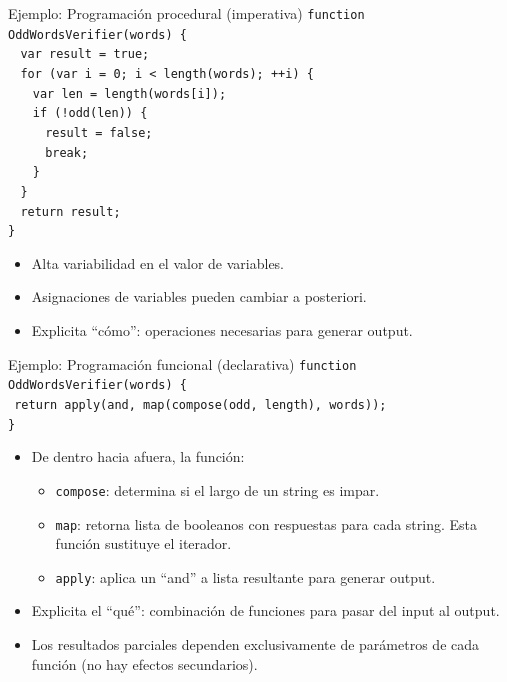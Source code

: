 \documentclass{beamer} %
\begin{document}
\begin{frame}{Ejemplo: Programación procedural (imperativa)}
  \texttt{function OddWordsVerifier(words) \{}\\
  $~~~~$\texttt{var result = true;}\\
  $~~~~$\texttt{for (var i = 0; i < length(words); ++i) \{}\\
  $~~~~~~~~$\texttt{var len = length(words[i]);}\\
  $~~~~~~~~$\texttt{if (!odd(len)) \{}\\
  $~~~~~~~~~~~~$\texttt{result = false;}\\
  $~~~~~~~~~~~~$\texttt{break;}\\
  $~~~~~~~~$\texttt{\}}\\
  $~~~~$\texttt{\}}\\
  $~~~~$\texttt{return result;}\\
  \texttt{\}}
  \pause
  \begin{itemize}
    \item Alta variabilidad en el valor de variables.
    \item Asignaciones de variables pueden cambiar a posteriori.
    \item Explicita ``cómo'': operaciones necesarias para generar output.
  \end{itemize}
\end{frame}

\begin{frame}{Ejemplo: Programación funcional (declarativa)}
  \texttt{function OddWordsVerifier(words) \{}\\
  $~~$\texttt{return apply(and, map(compose(odd, length), words));}\\
  \texttt{\}}\\
  \begin{itemize}
    \item<2-> De dentro hacia afuera, la función:
    \begin{itemize}
        \item<2-> \texttt{compose}: determina si el largo de un string es impar.
        \item<2-> \texttt{map}: retorna lista de booleanos con respuestas para cada string. Esta función sustituye el iterador.
        \item<2-> \texttt{apply}: aplica un ``and'' a lista resultante para generar output.
    \end{itemize}
    \item<3-> Explicita el ``qué'': combinación de funciones para pasar del input al output.
    \item<4-> Los resultados parciales dependen exclusivamente de parámetros de cada función (no hay efectos secundarios).
  \end{itemize}
\end{frame}
\end{document}
